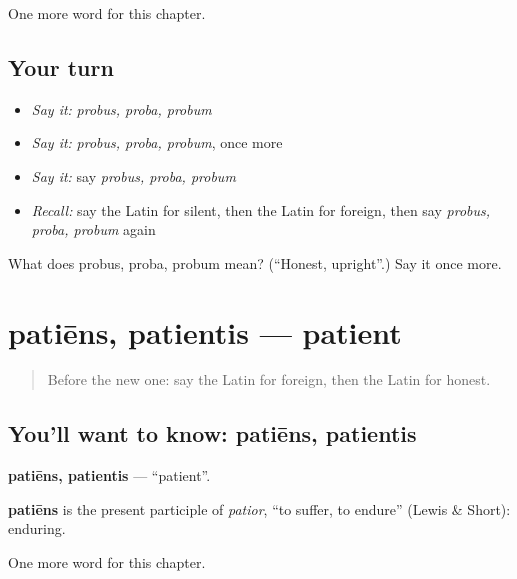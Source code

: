 \begin{grammarlens}[title={What you've built}]
One more word for this chapter.
\end{grammarlens}

\subsection*{Your turn}
\begin{itemize}
\raggedright
  \item \emph{Say it:} \emph{probus, proba, probum}
  \item \emph{Say it:} \emph{probus, proba, probum}, once more
  \item \emph{Say it:} say \emph{probus, proba, probum}
  \item \emph{Recall:} say the Latin for silent, then the Latin for foreign, then say \emph{probus, proba, probum} again
\end{itemize}

\begin{tcolorbox}[breakable,colback=teal!4,colframe=teal!35!black,title={Before you move on}]
What does probus, proba, probum mean? (\textquotedblleft{}Honest, upright\textquotedblright{}.) Say it once more.
\end{tcolorbox}
\section[patiēns, patientis]{patiēns, patientis — patient}

\label{lesson:LA-C213-patiens}



\begin{quote}
Before the new one: say the Latin for foreign, then the Latin for honest.
\end{quote}

\subsection*{You'll want to know: patiēns, patientis}
\textbf{patiēns, patientis} — \textquotedblleft{}patient\textquotedblright{}.

\begin{cousinweb}
\textbf{patiēns} is the present participle of \emph{patior}, \textquotedblleft{}to suffer, to endure\textquotedblright{} (Lewis \& Short): enduring.
\end{cousinweb}

\begin{grammarlens}[title={What you've built}]
One more word for this chapter.
\end{grammarlens}

